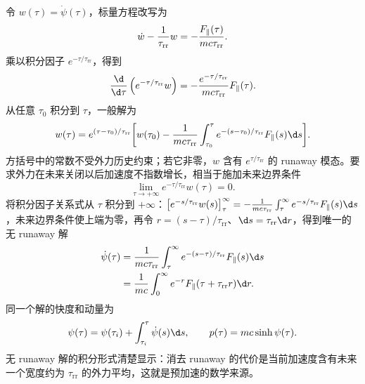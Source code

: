 令 $w(\tau)=\dot\psi(\tau)$，标量方程改写为
\begin{equation*}
 \dot w-{1\over\tau_{\mathrm{rr}}}w
 =-{F_\parallel(\tau)\over mc\tau_{\mathrm{rr}}}.
\end{equation*}
乘以积分因子 $e^{-\tau/\tau_{\mathrm{rr}}}$，得到
\begin{equation*}
 {\d\over\d\tau}
 \left(e^{-\tau/\tau_{\mathrm{rr}}}w\right)
 =-{e^{-\tau/\tau_{\mathrm{rr}}}\over mc\tau_{\mathrm{rr}}}
 F_\parallel(\tau).
\end{equation*}
从任意 $\tau_0$ 积分到 $\tau$，一般解为
\begin{equation*}
 w(\tau)
 =e^{(\tau-\tau_0)/\tau_{\mathrm{rr}}}
 \bigg[
 w(\tau_0)
 -{1\over mc\tau_{\mathrm{rr}}}
 \int_{\tau_0}^{\tau}
 e^{-(s-\tau_0)/\tau_{\mathrm{rr}}}F_\parallel(s)\d s
 \bigg].
\end{equation*}
方括号中的常数不受外力历史约束；若它非零，$w$ 含有 $e^{\tau/\tau_{\mathrm{rr}}}$ 的 runaway 模态。要求外力在未来关闭以后加速度不指数增长，相当于施加未来边界条件
\begin{equation*}
 \lim_{\tau\to+\infty}
 e^{-\tau/\tau_{\mathrm{rr}}}w(\tau)=0.
\end{equation*}
将积分因子关系式从 $\tau$ 积分到 $+\infty$：$\left[e^{-s/\tau_{\mathrm{rr}}}w(s)\right]_{\tau}^{\infty}=-\frac{1}{mc\tau_{\mathrm{rr}}}\int_{\tau}^{\infty}e^{-s/\tau_{\mathrm{rr}}}F_\parallel(s)\d s$，未来边界条件使上端为零，再令 $r=(s-\tau)/\tau_{\mathrm{rr}}$、$\d s=\tau_{\mathrm{rr}}\d r$，得到唯一的无 runaway 解
\begin{align*}
 \dot\psi(\tau)
 &={1\over mc\tau_{\mathrm{rr}}}
 \int_{\tau}^{\infty}
 e^{-(s-\tau)/\tau_{\mathrm{rr}}}F_\parallel(s)\d s\\
 &={1\over mc}
 \int_0^\infty e^{-r}
 F_\parallel(\tau+\tau_{\mathrm{rr}}r)\d r.
\end{align*}
同一个解的快度和动量为
\begin{equation*}
 \psi(\tau)=\psi(\tau_i)+\int_{\tau_i}^{\tau}\dot\psi(s)\d s,
 \qquad
 p(\tau)=mc\sinh\psi(\tau).
\end{equation*}
无 runaway 解的积分形式清楚显示：消去 runaway 的代价是当前加速度含有未来一个宽度约为 $\tau_{\mathrm{rr}}$ 的外力平均，这就是预加速的数学来源。

